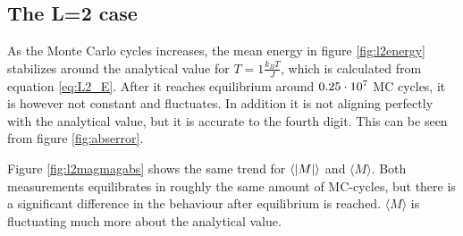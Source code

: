 



\subsection{The L=2 case}

As the Monte Carlo cycles increases, the mean energy in figure \ref{fig:l2energy} stabilizes around the analytical value for $ T = 1 \frac{k_BT}{J}$, which is calculated from equation \ref{eq:L2_E}. After it reaches equilibrium around $0.25\cdot 10^{7} $ MC cycles, it is however not constant and fluctuates. In addition it is not aligning perfectly with the analytical value, but it is accurate to the fourth digit. This can be seen from figure \ref{fig:abserror}. 

Figure \ref{fig:l2magmagabs} shows the same trend for $ \langle \abs{M} \rangle $ and $ \langle {M} \rangle $. Both measurements equilibrates in roughly the same amount of MC-cycles, but there is a significant difference in the behaviour after  equilibrium is reached. $ \langle {M} \rangle $ is fluctuating much more about the analytical value. 



